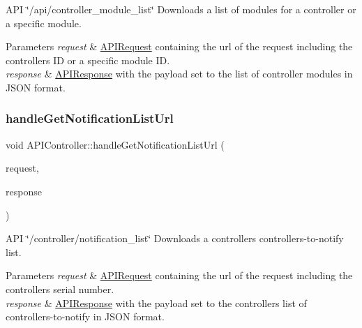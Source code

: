 A\+PI \char`\"{}/api/controller\+\_\+module\+\_\+list\char`\"{} Downloads a list of modules for a controller or a specific module. 
\begin{DoxyParams}{Parameters}
{\em request} & \hyperlink{class_a_p_i_request}{A\+P\+I\+Request} containing the url of the request including the controller\textquotesingle{}s ID or a specific module ID. \\
\hline
{\em response} & \hyperlink{class_a_p_i_response}{A\+P\+I\+Response} with the payload set to the list of controller modules in J\+S\+ON format. \\
\hline
\end{DoxyParams}
\mbox{\label{class_a_p_i_controller_a3217b84dcc811d83e4c7241a5e19c35c}} 
\subsubsection{\texorpdfstring{handle\+Get\+Notification\+List\+Url}{handleGetNotificationListUrl}}
{\footnotesize\ttfamily void A\+P\+I\+Controller\+::handle\+Get\+Notification\+List\+Url (\begin{DoxyParamCaption}\item[{const \hyperlink{class_a_p_i_request}{A\+P\+I\+Request} \&}]{request,  }\item[{\hyperlink{class_a_p_i_response}{A\+P\+I\+Response} $\ast$}]{response }\end{DoxyParamCaption})\hspace{0.3cm}{\ttfamily [slot]}}

A\+PI \char`\"{}/controller/notification\+\_\+list\char`\"{} Downloads a controller\textquotesingle{}s controllers-\/to-\/notify list. 
\begin{DoxyParams}{Parameters}
{\em request} & \hyperlink{class_a_p_i_request}{A\+P\+I\+Request} containing the url of the request including the controller\textquotesingle{}s serial number. \\
\hline
{\em response} & \hyperlink{class_a_p_i_response}{A\+P\+I\+Response} with the payload set to the controller\textquotesingle{}s list of controllers-\/to-\/notify in J\+S\+ON format. \\
\hline
\end{DoxyParams}
\mbox{\label{class_a_p_i_controller_a6274380cb71807d07d813b7e67e0c0c2}} 
